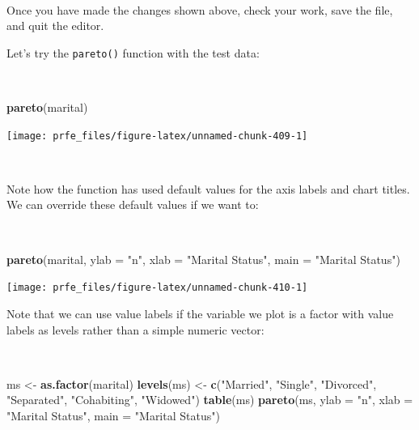 \documentclass[12pt,a4paper]{book}
\newenvironment{Shaded}{\begin{snugshade}}{\end{snugshade}}
\newcommand{\KeywordTok}[1]{\textcolor[rgb]{0.13,0.29,0.53}{\textbf{#1}}}
\newcommand{\DataTypeTok}[1]{\textcolor[rgb]{0.13,0.29,0.53}{#1}}
\newcommand{\StringTok}[1]{\textcolor[rgb]{0.31,0.60,0.02}{#1}}
\newcommand{\NormalTok}[1]{#1}
\theoremstyle{definition}
\theoremstyle{definition}
\theoremstyle{definition}
\theoremstyle{remark}
\begin{document}
~

Once you have made the changes shown above, check your work, save the
file, and quit the editor.

\newpage

Let's try the \texttt{pareto()} function with the test data:

~

\begin{Shaded}
\begin{Highlighting}[]
\KeywordTok{pareto}\NormalTok{(marital)}
\end{Highlighting}
\end{Shaded}

\begin{center}\texttt{[image: prfe\_files/figure-latex/unnamed-chunk-409-1]} \end{center}

~

Note how the function has used default values for the axis labels and
chart titles. We can override these default values if we want to:

~

\begin{Shaded}
\begin{Highlighting}[]
\KeywordTok{pareto}\NormalTok{(marital, }\DataTypeTok{ylab =} \StringTok{"n"}\NormalTok{, }\DataTypeTok{xlab =} \StringTok{"Marital Status"}\NormalTok{,}
       \DataTypeTok{main =} \StringTok{"Marital Status"}\NormalTok{)}
\end{Highlighting}
\end{Shaded}

\begin{center}\texttt{[image: prfe\_files/figure-latex/unnamed-chunk-410-1]} \end{center}

\newpage

Note that we can use value labels if the variable we plot is a factor
with value labels as levels rather than a simple numeric vector:

~

\begin{Shaded}
\begin{Highlighting}[]
\NormalTok{ms <-}\StringTok{ }\KeywordTok{as.factor}\NormalTok{(marital)}
\KeywordTok{levels}\NormalTok{(ms) <-}\StringTok{ }\KeywordTok{c}\NormalTok{(}\StringTok{"Married"}\NormalTok{, }\StringTok{"Single"}\NormalTok{, }\StringTok{"Divorced"}\NormalTok{, }\StringTok{"Separated"}\NormalTok{,}
                \StringTok{"Cohabiting"}\NormalTok{, }\StringTok{"Widowed"}\NormalTok{)}
\KeywordTok{table}\NormalTok{(ms)}
\KeywordTok{pareto}\NormalTok{(ms, }\DataTypeTok{ylab =} \StringTok{"n"}\NormalTok{, }\DataTypeTok{xlab =} \StringTok{"Marital Status"}\NormalTok{,}
       \DataTypeTok{main =} \StringTok{"Marital Status"}\NormalTok{)}
\end{Highlighting}
\end{Shaded}
\end{document}
